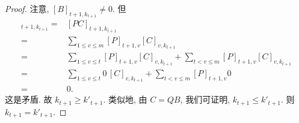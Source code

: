 \documentclass[../libro.tex]{subfiles}
\begin{document}
\begin{proof}
    注意, \([B]_{t+1,k_{t+1}} \neq 0\).
    但
    \begin{align*}
        [B]_{t+1,k_{t+1}}
        = {} &
        [P C]_{t+1,k_{t+1}}
        \\
        = {} &
        \sum_{1 \leq v \leq m}
        {[P]_{t+1,v} [C]_{v,k_{t+1}}}
        \\
        = {} &
        \sum_{1 \leq v \leq t}
        {[P]_{t+1,v} [C]_{v,k_{t+1}}}
        +
        \sum_{t < v \leq m}
        {[P]_{t+1,v} [C]_{v,k_{t+1}}}
        \\
        = {} &
        \sum_{1 \leq v \leq t}
        {0\, [C]_{v,k_{t+1}}}
        +
        \sum_{t < v \leq m}
        {[P]_{t+1,v} 0}
        \\
        = {} &
        0.
    \end{align*}
    这是矛盾.
    故 \(k_{t+1} \geq k'_{t+1}\).
    类似地, 由 \(C = Q B\),
    我们可证明, \(k_{t+1} \leq k'_{t+1}\).
    则 \(k_{t+1} = k'_{t+1}\).


\end{proof}
\end{document}
